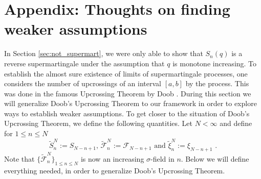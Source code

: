 \documentclass[phd]{UWMThesis}
\newcommand{\F}{\mathcal{F}}
\newcommand{\sn}[1]{S_{#1}}
\newcommand{\StN}[1]{\tilde{S}_{#1}^N}
\newcommand{\FtN}[1]{\tilde{\F}_{#1}^N}
\newcommand{\xitN}[1]{\tilde{\xi}_{#1}^N}
\newcommand{\mdot}{\textrm{ .}}
\renewcommand{\.}{\textrm{ .}}
\theoremstyle{definition}
\numberwithin{thm}{chapter}
\newcommand{\todo}{\TODO}
\begin{document}
\chapter{Appendix: Thoughts on finding weaker assumptions}

In Section \ref{sec:not_supermart}, we were only able to show that $S_n(q)$ is a reverse supermartingale under the assumption that $q$ is monotone increasing. To establish the almost sure existence of limits of supermartingale processes, one considers the number of upcrossings of an interval $[a,b]$ by the process. This was done in the famous Upcrossing Theorem by Doob \todo{cite}. During this section we will generalize Doob's Upcrossing Theorem to our framework in order to explore ways to establish weaker assumptions. To get closer to the situation of Doob's Upcrossing Theorem, we define the following quantities. Let $N<\infty$ and define for $1\leq n\leq N$ 
\begin{equation*}
\StN{n} := \sn{N-n+1} \textrm{, } \FtN{n} := \F_{N-n+1} \textrm{ \ and \ } \xitN{n} := \xi_{N-n+1}\mdot
\end{equation*}
Note that $\{\FtN{n}\}_{1\leq n\leq N}$ is now an increasing $\sigma$-field in $n$.
%
Below we will define everything needed, in order to generalize Doob's Upcrossing Theorem.
\end{document}
